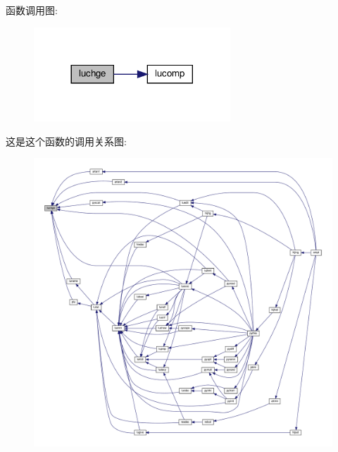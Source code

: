 函数调用图\+:
\nopagebreak
\begin{figure}[H]
\begin{center}
\leavevmode
\includegraphics[width=209pt]{luchge_8f90_a4732f265c9aa09be1602d6fe8db952c6_cgraph}
\end{center}
\end{figure}
这是这个函数的调用关系图\+:
\nopagebreak
\begin{figure}[H]
\begin{center}
\leavevmode
\includegraphics[width=350pt]{luchge_8f90_a4732f265c9aa09be1602d6fe8db952c6_icgraph}
\end{center}
\end{figure}
